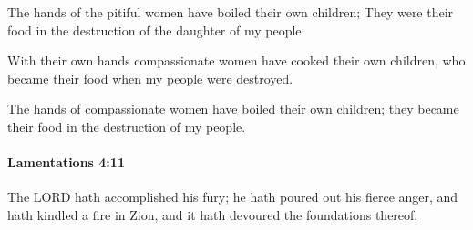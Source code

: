 			\begin{versebox}
					\item[BHS] 
					\item[LXX] 
					\item[ASV] The hands of the pitiful women have boiled their own children; They were their food in the destruction of the daughter of my people.
					\item[NIV] With their own hands compassionate women have cooked their own children, who became their food when my people were destroyed.
					\item[NRSV] The hands of compassionate women have boiled their own children; they became their food in the destruction of my people.
			\end{versebox}

		\paragraph{Lamentations 4:11} %
			\label{LAMENTATIONS-4-11}

			The LORD hath accomplished his fury; he hath poured out his fierce anger, and hath kindled a fire in Zion, and it hath devoured the foundations thereof.

